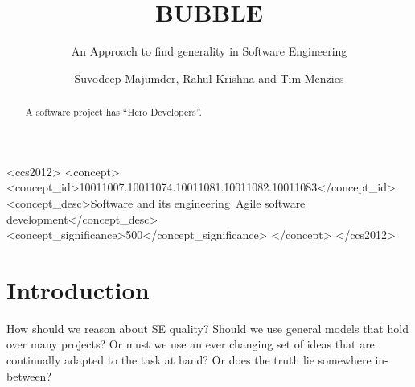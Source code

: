 \documentclass[sigconf]{acmart}
\theoremstyle{break}
\begin{document}



\title{BUBBLE}
\subtitle{An Approach to find generality in Software Engineering}

\author{Suvodeep Majumder, Rahul Krishna and Tim Menzies}


\begin{abstract}
A  software project has ``Hero  Developers''.

\end{abstract}




\begin{CCSXML}
<ccs2012>
<concept>
<concept_id>10011007.10011074.10011081.10011082.10011083</concept_id>
<concept_desc>Software and its engineering~Agile software 
development</concept_desc>
<concept_significance>500</concept_significance>
</concept>
</ccs2012>
\end{CCSXML}





\maketitle


\section{Introduction}
How should we reason about SE quality?  Should we use  general models that hold over many projects? Or must we use an ever changing set of ideas that are   continually adapted to the task at hand? 
Or does the truth lie somewhere in-between?  
\end{document}
